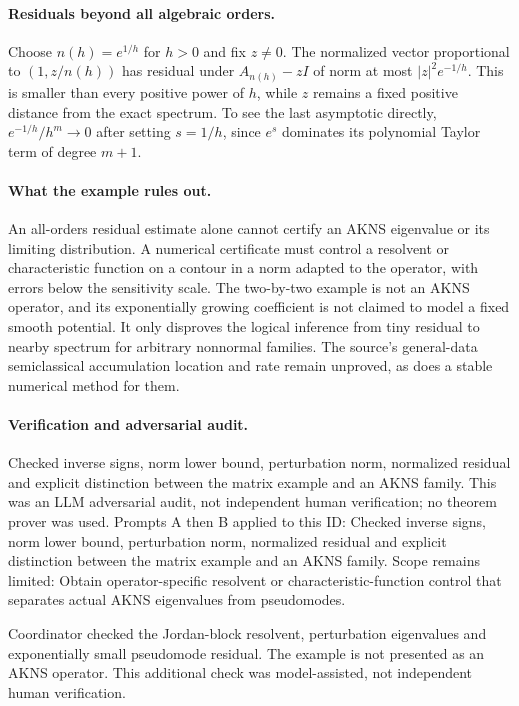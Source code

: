 \documentclass[11pt]{article}
\begin{document}
\paragraph{Residuals beyond all algebraic orders.}Choose \(n(h)=e^{1/h}\) for \(h>0\) and fix \(z\ne0\). The normalized vector proportional to \((1,z/n(h))\) has residual under \(A_{n(h)}-zI\) of norm at most \(|z|^2e^{-1/h}\). This is smaller than every positive power of \(h\), while \(z\) remains a fixed positive distance from the exact spectrum. To see the last asymptotic directly, \(e^{-1/h}/h^m\to0\) after setting \(s=1/h\), since \(e^s\) dominates its polynomial Taylor term of degree \(m+1\).
\paragraph{What the example rules out.}An all-orders residual estimate alone cannot certify an AKNS eigenvalue or its limiting distribution. A numerical certificate must control a resolvent or characteristic function on a contour in a norm adapted to the operator, with errors below the sensitivity scale. The two-by-two example is not an AKNS operator, and its exponentially growing coefficient is not claimed to model a fixed smooth potential. It only disproves the logical inference from tiny residual to nearby spectrum for arbitrary nonnormal families. The source's general-data semiclassical accumulation location and rate remain unproved, as does a stable numerical method for them.

\paragraph{Verification and adversarial audit.}
Checked inverse signs, norm lower bound, perturbation norm, normalized residual and explicit distinction between the matrix example and an AKNS family. This was an LLM adversarial audit, not independent human verification; no theorem prover was used. Prompts A then B applied to this ID: Checked inverse signs, norm lower bound, perturbation norm, normalized residual and explicit distinction between the matrix example and an AKNS family. Scope remains limited: Obtain operator-specific resolvent or characteristic-function control that separates actual AKNS eigenvalues from pseudomodes.

Coordinator checked the Jordan-block resolvent, perturbation eigenvalues and exponentially small pseudomode residual. The example is not presented as an AKNS operator. This additional check was model-assisted, not independent human verification.
\end{document}
